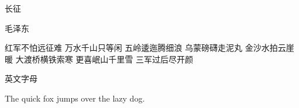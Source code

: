\documentclass[a4paper,twoside]{article}
\begin{document}
\begin{center}
长\qquad\qquad 征

毛泽东

红军不怕远征难 万水千山只等闲
五岭逶迤腾细浪 乌蒙磅礴走泥丸
金沙水拍云崖暖 大渡桥横铁索寒
更喜岷山千里雪 三军过后尽开颜

\end{center}

\vfill
英文字母

The quick fox jumps over the lazy dog.
\end{document}
